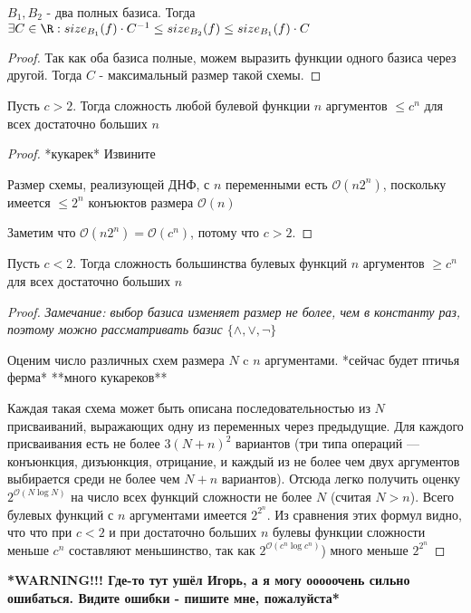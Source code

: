\begin{theorem}

	$B_1, B_2$ - два полных базиса. Тогда $\exists C \in \R : size_{B_1}(f)\cdot C^{-1} \leq size_{B_2}(f) \leq size_{B_1}(f)\cdot C$
	\begin{proof} \thmslashn
	
		Так как оба базиса полные, можем выразить функции одного базиса через другой. Тогда $C$ - максимальный размер такой схемы.
	\end{proof}
\end{theorem}

\begin{theorem} \thmslashn

	Пусть $c > 2$. Тогда сложность любой булевой функции $n$ аргументов $\leq c^n$ для всех достаточно больших $n$
	\begin{proof} \thmslashn
	
		*кукарек* Извините
		
		Размер схемы, реализующей ДНФ, с $n$ переменными есть $\mathcal{O}(n2^n)$, поскольку имеется $\leq 2^n$ конъюктов размера $\mathcal{O}(n)$
		
		Заметим что $\mathcal{O}(n2^n) = \mathcal{O}(c^n)$, потому что $c > 2$.
	\end{proof}
\end{theorem}

\begin{theorem} \thmslashn

	Пусть $c < 2$. Тогда сложность большинства булевых функций $n$ аргументов $\geq c^n$ для всех достаточно больших $n$
	\begin{proof} \thmslashn
	
		\textit{Замечание: выбор базиса изменяет размер не более, чем в константу раз, поэтому можно рассматривать базис $\{\land, \lor, \neg\}$}
		
		Оценим число различных схем размера $N$ c $n$ аргументами. *сейчас будет птичья ферма* **много кукареков** 
		
		Каждая такая схема может быть описана последовательностью из $N$ присваиваний, 
		выражающих одну из переменных через предыдущие. 
		Для каждого присваивания есть не более $3(N + n)^2$ вариантов
		(три типа операций — конъюнкция, дизъюнкция, отрицание, 
		и каждый из не более чем двух аргументов выбирается среди не более чем $N + n$ вариантов). 
		Отсюда легко получить оценку $2^{\mathcal{O}(N\log N)}$ на число всех функций сложности не более $N$ (считая $N > n$).
		Всего булевых функций с $n$ аргументами имеется $2^{2^n}$. 
		Из сравнения этих формул видно, что что при $c < 2$ и при достаточно больших $n$ булевы функции сложности меньше $c^n$ 
		составляют меньшинство, так как $2^{\mathcal{O}(c^n\log c^n)}$) много меньше $2^{2^n}$
	\end{proof}
\end{theorem}
\textbf{*WARNING!!! Где-то тут ушёл Игорь, а я могу ооооочень сильно ошибаться. Видите ошибки - пишите мне, пожалуйста*}

